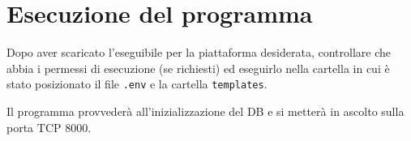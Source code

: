 \documentclass[a4paper,12pt]{report}
\begin{document}
	\section{Esecuzione del programma}
	\par Dopo aver scaricato l'eseguibile per la piattaforma desiderata, controllare che abbia i permessi di esecuzione (se richiesti) ed eseguirlo nella cartella in cui è stato posizionato il file \texttt{.env} e la cartella \texttt{templates}.
	\par Il programma provvederà all'inizializzazione del DB e si metterà in ascolto sulla porta TCP 8000.
    \listoffigures
\end{document}
